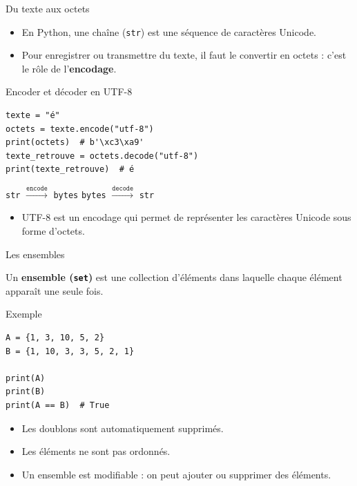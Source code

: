 \documentclass[10pt]{beamer}
\begin{document}
\begin{frame}[fragile]{Du texte aux octets}

\begin{itemize}
    \item En Python, une chaîne (\texttt{str}) est une séquence de caractères
    Unicode.
    \item Pour enregistrer ou transmettre du texte, il faut le convertir
    en octets : c'est le rôle de l'\textbf{encodage}.
\end{itemize}

\begin{exampleblock}{Encoder et décoder en UTF-8}
\small
\begin{lstlisting}
texte = "é"
octets = texte.encode("utf-8")
print(octets)  # b'\xc3\xa9'
texte_retrouve = octets.decode("utf-8")
print(texte_retrouve)  # é
\end{lstlisting}
\end{exampleblock}

\begin{center}
\small
\texttt{str} \quad $\xrightarrow{\texttt{encode}}$ \quad
\texttt{bytes} \qquad
\texttt{bytes} \quad $\xrightarrow{\texttt{decode}}$ \quad
\texttt{str}
\end{center}

\begin{itemize}
    \item UTF-8 est un encodage qui permet de représenter les caractères
    Unicode sous forme d'octets.
\end{itemize}

\end{frame}

\begin{frame}[fragile]{Les ensembles}

Un \textbf{ensemble (\texttt{set})} est une collection
d'éléments dans laquelle chaque élément apparaît une seule fois.

\begin{exampleblock}{Exemple}
\small
\begin{lstlisting}
A = {1, 3, 10, 5, 2}
B = {1, 10, 3, 3, 5, 2, 1}

print(A)
print(B)
print(A == B)  # True
\end{lstlisting}
\end{exampleblock}

\begin{itemize}
    \item Les doublons sont automatiquement supprimés.
    \item Les éléments ne sont pas ordonnés.
    \item Un ensemble est modifiable : on peut ajouter ou supprimer
    des éléments.
\end{itemize}

\end{frame}
\end{document}
